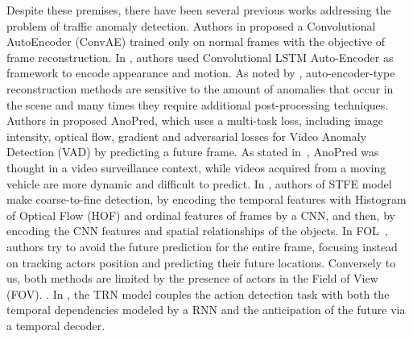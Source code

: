 Despite these premises, there have been several previous works addressing the problem of traffic anomaly detection.
Authors in \cite{hasan2016learning} proposed a Convolutional AutoEncoder (ConvAE) trained only on normal frames with the objective of frame reconstruction.
In \cite{luo2017remembering,wang2018abnormal}, authors used Convolutional LSTM Auto-Encoder as framework to encode appearance and motion.
As noted by \cite{ramachandra2020survey}, auto-encoder-type reconstruction methods are sensitive to the amount of anomalies that occur in the scene and many times they require additional post-processing techniques.
Authors in \cite{liu2018future} proposed AnoPred, which uses a multi-task loss, including image intensity, optical flow, gradient and adversarial losses for Video Anomaly Detection (VAD) by predicting a future frame.
As stated in~\cite{9712446}, AnoPred was thought in a video surveillance context, while videos acquired from a moving vehicle are more dynamic and difficult to predict.
In \cite{zhou_spatio-temporal_2022}, authors of STFE model make coarse-to-fine detection, by encoding the temporal features with Histogram of Optical Flow (HOF) \cite{wang2013action} and ordinal features of frames by a CNN, and then, by encoding the CNN features and spatial relationships of the objects.
In FOL~\cite{9712446}, authors try to avoid the future prediction for the entire frame, focusing instead on tracking actors position and predicting their future locations.
Conversely to us, both methods are limited by the presence of actors in the Field of View (FOV).
.
In \cite{xu2019temporal}, the TRN model couples the action detection task with both the temporal dependencies modeled by a RNN and the anticipation of the future via a temporal decoder.
